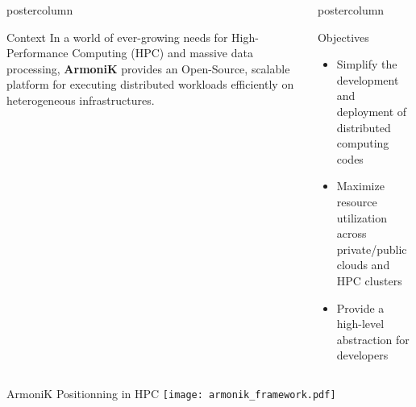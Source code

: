 \begin{frame}[fragile]

  \begin{columns}[T]
    \begin{column}{.49\textwidth}
      \begin{beamercolorbox}[center,wd=\textwidth]{postercolumn}
        \begin{minipage}[T]{.96\textwidth}
            \begin{block}{Context}
              In a world of ever-growing needs for High-Performance Computing (HPC) and massive data processing, \textbf{ArmoniK} provides an Open-Source, scalable platform for executing distributed workloads efficiently on heterogeneous infrastructures.
            \end{block}
        \end{minipage}
      \end{beamercolorbox}
      \vfill
    \end{column}
    \begin{column}{.49\textwidth}
      \begin{beamercolorbox}[center,wd=\textwidth]{postercolumn}
        \begin{minipage}[T]{.96\textwidth}
              \begin{block}{Objectives}
                \begin{itemize}
                  \item Simplify the development and deployment of distributed computing codes
                  \item Maximize resource utilization across private/public clouds and HPC clusters
                  \item Provide a high-level abstraction for developers
                \end{itemize}
              \end{block}
        \end{minipage}
      \end{beamercolorbox}
    \end{column}
  \end{columns}
  \vfil

  \begin{center}
  \begin{minipage}[T]{.975\textwidth}
  \begin{block}{ArmoniK Positionning in HPC}
    \centering
    \texttt{[image: armonik\_framework.pdf]}
  \end{block}
  \end{minipage}
  \end{center}
  \vfill


\end{frame}
